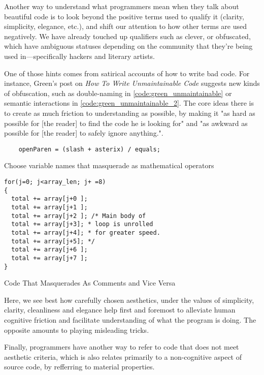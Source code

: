\vspace*{1\baselineskip}

Another way to understand what programmers mean when they talk about beautiful code is to look beyond the positive terms used to qualify it (clarity, simplicity, elegance, etc.), and shift our attention to how other terms are used negatively. We have already touched up qualifiers such as clever, or obfuscated, which have ambiguous statuses depending on the community that they're being used in—specifically hackers and literary artists.

One of those hints comes from satirical accounts of how to write bad code. For instance, Green's post on \emph{ How To Write Unmaintainable Code} suggests new kinds of obfuscation, such as double-naming in \ref{code:green_unmaintainable} or semantic interactions in \ref{code:green_unmaintainable_2}. The core ideas there is to create as much friction to understanding as possible, by making it "as hard as possible for [the reader] to find the code he is looking for" and "as awkward as possible for [the reader] to safely ignore anything."\cite{green_how_2006}.

\begin{listing}
  \begin{verbatim}
    openParen = (slash + asterix) / equals; 
  \end{verbatim}
  \caption{Choose variable names that masquerade as mathematical operators}
  \label{code:green_unmaintainable}
\end{listing}

\begin{listing}
  \begin{verbatim}
for(j=0; j<array_len; j+ =8)
{
  total += array[j+0 ];
  total += array[j+1 ];
  total += array[j+2 ]; /* Main body of
  total += array[j+3]; * loop is unrolled
  total += array[j+4]; * for greater speed.
  total += array[j+5]; */
  total += array[j+6 ];
  total += array[j+7 ];
} 
\end{verbatim}
  \caption{Code That Masquerades As Comments and Vice Versa}
  \label{code:green_unmaintainable_2}
\end{listing}

Here, we see best how carefully chosen aesthetics, under the values of simplicity, clarity, cleanliness and elegance help first and foremost to alleviate human cognitive friction and facilitate understanding of what the program is doing. The opposite amounts to playing misleading tricks.

Finally, programmers have another way to refer to code that does not meet aesthetic criteria, which is also relates primarily to a non-cognitive aspect of source code, by refferring to material properties.

